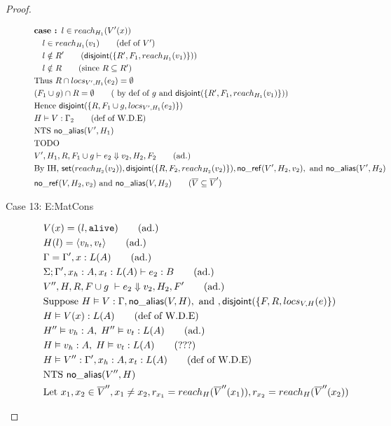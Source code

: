 \documentclass[11pt]{article}
\newcommand{\ms}[1]{\ensuremath{\mathsf{#1}}}
\newcommand{\irl}[1]{\mathtt{#1}}
\newcommand{\na}[1]{\mathsf{no\_alias}(#1)}
\newcommand{\nr}[1]{\mathsf{no\_ref}(#1)}
\newcommand{\dist}[1]{\mathsf{disjoint}(#1)}
\begin{document}
\begin{proof}
\begin{description}
\begin{align*}
  &\textbf{case : } l \in reach_{H_1}(V'(x))\\
  &\quad l \in reach_{H_1}(v_1) \tag{def of $V'$}\\
  &\quad l \notin R' \tag{$\dist{\{R',F_1,reach_{H_1}(v_1)\}}$}\\
  &\quad l \notin R \tag{since  $R \subseteq R'$}\\
  &\text{Thus }  R \cap locs_{V',H_1}(e_2) = \emptyset\\
  &(F_1 \cup  g) \cap R = \emptyset \tag{ by def of  $g$ and  $\dist{\{R',F_1,reach_{H_1}(v_1)\}}$}\\
  &\text{Hence } \dist{\{R, F_1 \cup g, locs_{V',H_1}(e_2)\}}\\
  &H \vDash V : \Gamma_2 \tag{def of W.D.E}\\
  &\text{NTS } \na{V',H_1}\\
  &\text{TODO}\\
  &V',H_1,R, F_1 \cup g \vdash e_2 \Downarrow v_2,H_2,F_2 \tag{ad.}\\
  &\text{By IH, } \ms{set}(reach_{H_2}(v_2)), \dist{\{R,F_2,reach_{H_2}(v_2)\}}, \nr{V',H_2,v_2},\text{ and } \na{V',H_2}\\
  &\nr{V,H_2,v_2} \text{ and } \na{V,H_2} \tag{$\overline V \subseteq \overline V'$}\\
  \end{align*}
  \item [Case 13: E:MatCons]
  \begin{align*}
  &V(x) = (l,\irl{alive}) \tag{ad.}\\
  &H(l) = \pairexcst{v_h}{v_t} \tag{ad.}\\
  &\Gamma = \Gamma', x : L(A) \tag{ad.}\\
  &\Sigma; \Gamma', x_h : A, x_t : L(A) \vdash e_2 : B \tag{ad.}\\
  &V'',H,R,F \cup g \; \vdash e_2 \Downarrow v_2, H_2, F' \tag{ad.} \\
  &\text{Suppose } H \vDash V : \Gamma, \na{V,H}, \text{ and },\dist{\{F,R,locs_{V,H}(e)\}}\\
  &H \vDash V(x) : L(A) \tag{def of W.D.E}\\
  &H''\vDash v_h : A,\; H'' \vDash v_t : L(A) \tag{ad.}\\
  &H\vDash v_h : A,\; H \vDash v_t : L(A) \tag{???}\\
  &H \vDash V'' : \Gamma', x_h : A, x_t : L(A) \tag{def of W.D.E}\\
  &\text{NTS } \na{V'',H}\\
  &\text{Let } x_1, x_2 \in \overline V'', x_1 \ne x_2, r_{x_1} = reach_H(\overline V''(x_1)), r_{x_2} = reach_H(\overline V''(x_2))\\

\end{align*}
\end{description}
\end{proof}
\end{document}
